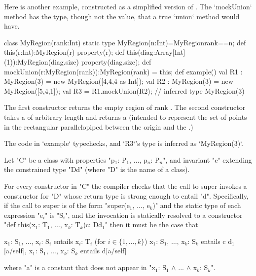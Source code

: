 \begin{ex}
Here is another example, constructed as a simplified 
version of .  The \xcd`mockUnion` method 
has the type, though not the value, that a true \xcd`union` method would have.

\begin{xten}
class MyRegion(rank:Int) {
  static type MyRegion(n:Int)=MyRegion{rank==n};
  def this(r:Int):MyRegion(r) {
    property(r);
  }
  def this(diag:Array[Int](1)):MyRegion(diag.size){ 
    property(diag.size);
  }
  def mockUnion(r:MyRegion(rank)):MyRegion(rank) = this;
  def example() {
    val R1 : MyRegion(3) = new MyRegion([4,4,4 as Int]); 
    val R2 : MyRegion(3) = new MyRegion([5,4,1]); 
    val R3 = R1.mockUnion(R2); // inferred type MyRegion(3)
  }
}
\end{xten}
%
The first constructor returns the empty region of rank .  The
second constructor takes a  of arbitrary length
 and returns a  (intended to represent the set
of points in the rectangular parallelopiped between the origin and the
.)

The code in \xcd`example` typechecks, and \xcd`R3`'s type is inferred as
\xcd`MyRegion(3)`.  


\end{ex}

   Let \xcd"C" be a class with properties
   \xcdmath"p$_1$: P$_1$, $\dots$, p$_n$: P$_n$", and invariant \xcd"c"
   extending the constrained type \xcd"D{d}" (where \xcd"D" is the name of a
   class).



   For every constructor in \xcd"C" the compiler checks that the call to
   super invokes a constructor for \xcd"D" whose return type is strong enough
   to entail \xcd"d". Specifically, if the call to super is of the form 
     \xcdmath"super(e$_1$, $\dots$, e$_k$)"
   and the static type of each expression \xcdmath"e$_i$" is
   \xcdmath"S$_i$", and the invocation
   is statically resolved to a constructor
\xcdmath"def this(x$_1$: T$_1$, $\dots$, x$_k$: T$_k$){c}: D{d$_1$}"
   then it must be the case that 
\begin{xtenmath}
x$_1$: S$_1$, $\dots$, x$_i$: S$_i$ entails x$_i$: T$_i$  (for $i \in \{1, \dots, k\}$)
x$_1$: S$_1$, $\dots$, x$_k$: S$_k$ entails c  
d$_1$[a/self], x$_1$: S$_1$, ..., x$_k$: S$_k$ entails d[a/self]      
\end{xtenmath}
\noindent where \xcd"a" is a constant that does not appear in 
\xcdmath"x$_1$: S$_1$ $\wedge$ ... $\wedge$ x$_k$: S$_k$".

